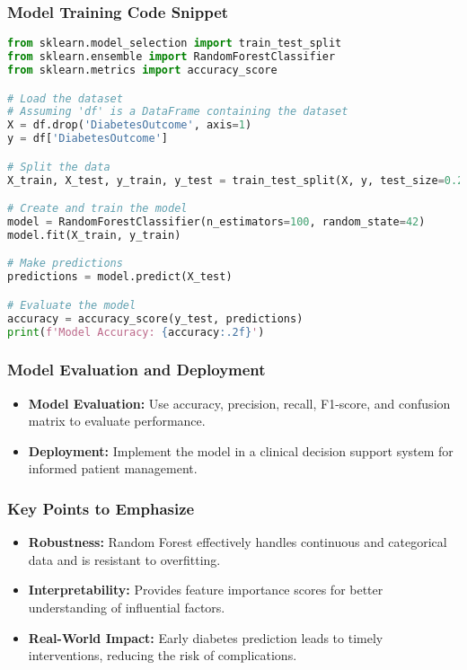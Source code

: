 \documentclass[aspectratio=169]{beamer}
\begin{document}
\begin{frame}[fragile]
    \frametitle{Model Training Code Snippet}
    \begin{lstlisting}[language=Python]
from sklearn.model_selection import train_test_split
from sklearn.ensemble import RandomForestClassifier
from sklearn.metrics import accuracy_score

# Load the dataset
# Assuming 'df' is a DataFrame containing the dataset
X = df.drop('DiabetesOutcome', axis=1)
y = df['DiabetesOutcome']

# Split the data
X_train, X_test, y_train, y_test = train_test_split(X, y, test_size=0.2, random_state=42)

# Create and train the model
model = RandomForestClassifier(n_estimators=100, random_state=42)
model.fit(X_train, y_train)

# Make predictions
predictions = model.predict(X_test)

# Evaluate the model
accuracy = accuracy_score(y_test, predictions)
print(f'Model Accuracy: {accuracy:.2f}')
    \end{lstlisting}
\end{frame}

\begin{frame}
    \frametitle{Model Evaluation and Deployment}
    \begin{itemize}
        \item \textbf{Model Evaluation:} Use accuracy, precision, recall, F1-score, and confusion matrix to evaluate performance.
        \item \textbf{Deployment:} Implement the model in a clinical decision support system for informed patient management.
    \end{itemize}
\end{frame}

\begin{frame}
    \frametitle{Key Points to Emphasize}
    \begin{itemize}
        \item \textbf{Robustness:} Random Forest effectively handles continuous and categorical data and is resistant to overfitting.
        \item \textbf{Interpretability:} Provides feature importance scores for better understanding of influential factors.
        \item \textbf{Real-World Impact:} Early diabetes prediction leads to timely interventions, reducing the risk of complications.
    \end{itemize}
\end{frame}
\end{document}

